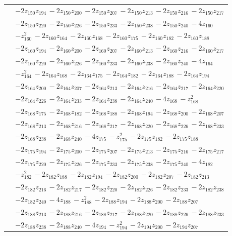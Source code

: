 \begin{longtable}{@{}r p{0.88\linewidth}@{}}
 & $-2z_{150}z_{194}\,-2z_{150}z_{200}\,-2z_{150}z_{207}\,-2z_{150}z_{213}\,-2z_{150}z_{216}\,-2z_{150}z_{217}$\\
 & $-2z_{150}z_{220}\,-2z_{150}z_{226}\,-2z_{150}z_{233}\,-2z_{150}z_{238}\,-2z_{150}z_{240}\,-4z_{160}$\\
 & $-z_{160}^{2}\,-2z_{160}z_{164}\,-2z_{160}z_{168}\,-2z_{160}z_{175}\,-2z_{160}z_{182}\,-2z_{160}z_{188}$\\
 & $-2z_{160}z_{194}\,-2z_{160}z_{200}\,-2z_{160}z_{207}\,-2z_{160}z_{213}\,-2z_{160}z_{216}\,-2z_{160}z_{217}$\\
 & $-2z_{160}z_{220}\,-2z_{160}z_{226}\,-2z_{160}z_{233}\,-2z_{160}z_{238}\,-2z_{160}z_{240}\,-4z_{164}$\\
 & $-z_{164}^{2}\,-2z_{164}z_{168}\,-2z_{164}z_{175}\,-2z_{164}z_{182}\,-2z_{164}z_{188}\,-2z_{164}z_{194}$\\
 & $-2z_{164}z_{200}\,-2z_{164}z_{207}\,-2z_{164}z_{213}\,-2z_{164}z_{216}\,-2z_{164}z_{217}\,-2z_{164}z_{220}$\\
 & $-2z_{164}z_{226}\,-2z_{164}z_{233}\,-2z_{164}z_{238}\,-2z_{164}z_{240}\,-4z_{168}\,-z_{168}^{2}$\\
 & $-2z_{168}z_{175}\,-2z_{168}z_{182}\,-2z_{168}z_{188}\,-2z_{168}z_{194}\,-2z_{168}z_{200}\,-2z_{168}z_{207}$\\
 & $-2z_{168}z_{213}\,-2z_{168}z_{216}\,-2z_{168}z_{217}\,-2z_{168}z_{220}\,-2z_{168}z_{226}\,-2z_{168}z_{233}$\\
 & $-2z_{168}z_{238}\,-2z_{168}z_{240}\,-4z_{175}\,-z_{175}^{2}\,-2z_{175}z_{182}\,-2z_{175}z_{188}$\\
 & $-2z_{175}z_{194}\,-2z_{175}z_{200}\,-2z_{175}z_{207}\,-2z_{175}z_{213}\,-2z_{175}z_{216}\,-2z_{175}z_{217}$\\
 & $-2z_{175}z_{220}\,-2z_{175}z_{226}\,-2z_{175}z_{233}\,-2z_{175}z_{238}\,-2z_{175}z_{240}\,-4z_{182}$\\
 & $-z_{182}^{2}\,-2z_{182}z_{188}\,-2z_{182}z_{194}\,-2z_{182}z_{200}\,-2z_{182}z_{207}\,-2z_{182}z_{213}$\\
 & $-2z_{182}z_{216}\,-2z_{182}z_{217}\,-2z_{182}z_{220}\,-2z_{182}z_{226}\,-2z_{182}z_{233}\,-2z_{182}z_{238}$\\
 & $-2z_{182}z_{240}\,-4z_{188}\,-z_{188}^{2}\,-2z_{188}z_{194}\,-2z_{188}z_{200}\,-2z_{188}z_{207}$\\
 & $-2z_{188}z_{213}\,-2z_{188}z_{216}\,-2z_{188}z_{217}\,-2z_{188}z_{220}\,-2z_{188}z_{226}\,-2z_{188}z_{233}$\\
 & $-2z_{188}z_{238}\,-2z_{188}z_{240}\,-4z_{194}\,-z_{194}^{2}\,-2z_{194}z_{200}\,-2z_{194}z_{207}$\\

\end{longtable}
